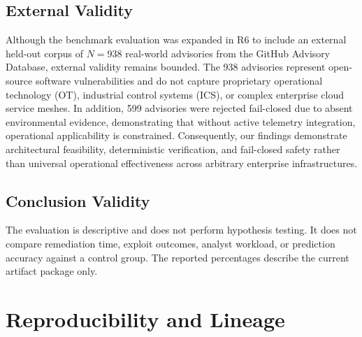 \documentclass[conference]{IEEEtran}
\begin{document}
\subsection{External Validity}

Although the benchmark evaluation was expanded in R6 to include an external held-out corpus of $N=938$ real-world advisories from the GitHub Advisory Database, external validity remains bounded. The 938 advisories represent open-source software vulnerabilities and do not capture proprietary operational technology (OT), industrial control systems (ICS), or complex enterprise cloud service meshes. In addition, 599 advisories were rejected fail-closed due to absent environmental evidence, demonstrating that without active telemetry integration, operational applicability is constrained. Consequently, our findings demonstrate architectural feasibility, deterministic verification, and fail-closed safety rather than universal operational effectiveness across arbitrary enterprise infrastructures.

\subsection{Conclusion Validity}

The evaluation is descriptive and does not perform hypothesis testing.
It does not compare remediation time, exploit outcomes, analyst workload, or
prediction accuracy against a control group. The reported percentages describe
the current artifact package only.

\section{Reproducibility and Lineage}
\end{document}
